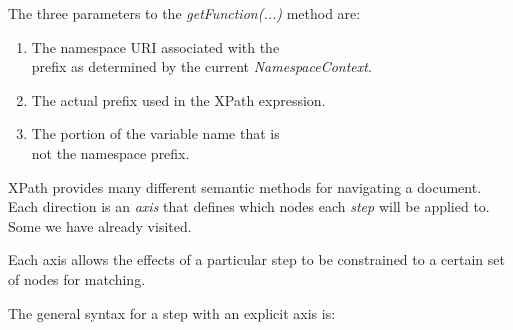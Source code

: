 \documentclass[20pt,landscape,headrule,footrule]{foils}
\begin{document}
The three parameters to the \emph{getFunction(...)}
method are:

\begin{minipage}{\textwidth}
\small
\begin{enumerate}
  \item {} The namespace URI associated with the\\
    prefix as determined by the current \emph{NamespaceContext}.
  \item {} The actual prefix used in the XPath expression.
  \item {} The portion of the variable name that is\\ 
    not the namespace prefix.
\end{enumerate}
\end{minipage}




XPath provides many different semantic methods for navigating
a document.  Each direction is an \emph{axis} that defines
which nodes each \emph{step} will be applied to.  Some we
have already visited.

Each axis allows the effects of a particular step to be 
constrained to a certain set of nodes for matching.

The general syntax for a step with an explicit axis is:



\end{document}

